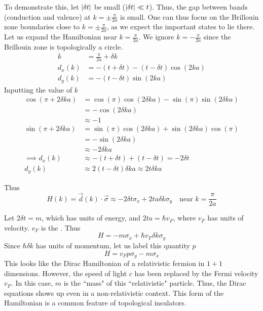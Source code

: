\documentclass[12pt,a4paper,titlepage]{article}
\newcommand{\trm}[1]{\textrm{#1}} %
\newcommand{\ul}[1]{\underline{\smash{#1}}} %
\begin{document}
To demonstrate this, let $\abs{\delta t}$ be small ($\abs{\delta t}\ll t$). Thus, the gap between bands (conduction and valence) at $k=\pm\frac{\pi}{2a}$ is small. One can thus focus on the Brillouin zone boundaries close to $k=\pm\frac{\pi}{2a}$, as we expect the important states to lie there. Let us expand the Hamiltonian near $k=\frac{\pi}{2a}$. We ignore $k=-\frac{\pi}{2a}$ since the Brillouin zone is topologically a circle.
\begin{equation}
\begin{aligned}
k&=\frac{\pi}{2a}+\delta k\\
d_{x}(k)&=-(t+\delta t)-(t-\delta t)\cos(2ka)\\
d_{y}(k)&=-(t-\delta t)\sin(2ka)
\end{aligned}
\end{equation}
Inputting the value of $k$
\begin{equation}
\begin{aligned}
\cos(\pi+2\delta ka)&=\cos(\pi)\cos(2\delta ka)-\sin(\pi)\sin(2\delta ka)\\
&=-\cos(2\delta ka)\\
&\approx-1\\
\sin(\pi+2\delta ka)&=\sin(\pi)\cos(2\delta ka)+\sin(2\delta ka)\cos(\pi)\\
&=-\sin(2\delta ka)\\
&\approx-2\delta ka\\
\implies d_{x}(k)&\approx-(t+\delta t)+(t-\delta t)=-2\delta t\\
d_{y}(k)&\approx2(t-\delta t)\delta ka\approx 2t\delta ka
\end{aligned}
\end{equation}

Thus
\begin{equation}
H(k)=\vec{d}(k)\cdot\vec{\sigma}\approx-2\delta t\sigma_{x}+2ta\delta k\sigma_{y}\quad\trm{near $k=\frac{\pi}{2a}$}
\end{equation}

Let $2\delta t=m$, which has units of energy, and $2ta=\hbar v_{F}$, where $v_{F}$ has units of velocity. $v_{F}$ is the \ul{Fermi velocity}. Thus
\begin{equation}
H=-m\sigma_{x}+\hbar v_{F}\delta k\sigma_{y}
\end{equation}
Since $\hbar\delta k$ has units of momentum, let us label this quantity $p$
\begin{equation}
H=v_{F}p\sigma_{y}-m\sigma_{x}
\end{equation}
This looks like the Dirac Hamiltonian of a relativistic fermion in $1+1$ dimensions. However, the speed of light $c$ has been replaced by the Fermi velocity $v_{F}$. In this case, $m$ is the ``mass" of this ``relativistic" particle. Thus, the Dirac equations shows up even in a non-relativistic context. This form of the Hamiltonian is a common feature of topological insulators.\\
\end{document}
